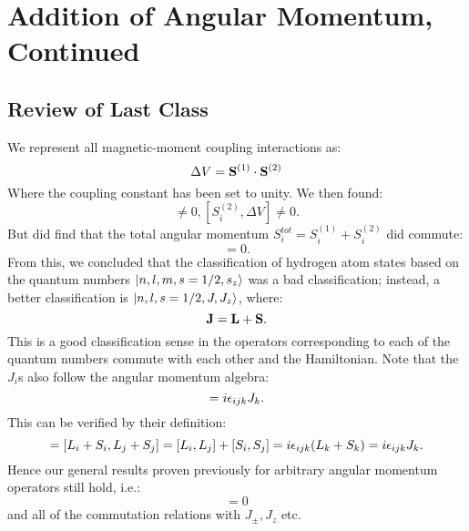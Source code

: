 \section{Addition of Angular Momentum, Continued}
\subsection{Review of Last Class}
We represent all magnetic-moment coupling interactions as:
\begin{equation}
    \Delta V = \mathbf{S}^{(1)} \cdot \mathbf{S}^{(2)}
\end{equation}
Where the coupling constant has been set to unity. We then found:
\begin{equation}
    [S_i^{(1)}, \Delta V] \neq 0, [S_i^{(2)}, \Delta V] \neq 0.
\end{equation}
But did find that the total angular momentum $S_i^{tot} = S_i^{(1)} + S_i^{(2)}$ did commute:
\begin{equation}
    [S_i^{tot}, \Delta V] = 0.
\end{equation}
From this, we concluded that the classification of hydrogen atom states based on the quantum numbers $\lvert n, l, m, s=1/2, s_z \rangle$ was a bad classification; instead, a better classification is $\lvert n, l, s= 1/2, J, J_z \rangle$, where:
\begin{equation}
    \mathbf{J} = \mathbf{L} + \mathbf{S}.
\end{equation}
This is a good classification sense in the operators corresponding to each of the quantum numbers commute with each other and the Hamiltonian. Note that the $J_i$s also follow the angular momentum algebra:
\begin{equation}
    [J_i, J_j] = i\e_{ijk}J_k.
\end{equation}
This can be verified by their definition:
\begin{equation}
    [J_i, J_j] = [L_i + S_i, L_j + S_j] = [L_i, L_j] + [S_i, S_j] = i\e_{ijk}(L_k + S_k) = i\e_{ijk}J_k.
\end{equation}
Hence our general results proven previously for arbitrary angular momentum operators still hold, i.e.:
\begin{equation}
    [\v{J}^2, J_i] = 0
\end{equation}
and all of the commutation relations with $J_\pm, J_z$ etc.

